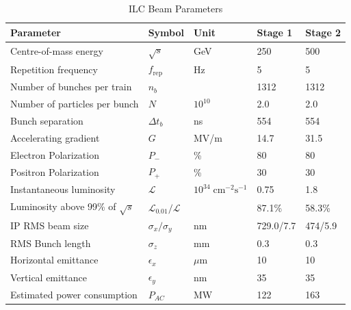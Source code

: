 \begin{table}
\caption[ILC Beam Parameters]{ILC Beam Parameters\cite{ILCTDR}}
\label{table:ilcbeamparameters}
\centering
\begin{tabular}{l l l l l }
\toprule
\textbf{Parameter}                  & \textbf{Symbol}         & \textbf{Unit}& \textbf{Stage 1} & \textbf{Stage 2} \\
\midrule
Centre-of-mass energy               & $\sqrt{s}$                &GeV                                        & 250 & 500 \\
Repetition frequency                & $f_{\text{rep}}$        &Hz                                         & 5 & 5 \\
Number of bunches per train         & $n_{b}$                 &                                           & 1312 & 1312 \\
Number of particles per bunch                    & $N$                     &$10^{10}$                      & 2.0 & 2.0 \\
Bunch separation                    & $\Delta t_b$             &ns                                         & 554 & 554 \\
\midrule
Accelerating gradient               & $G$                     &MV/m                                       & 14.7 & 31.5 \\
Electron Polarization               & $P_-$                   &\%                                       & 80 & 80 \\
Positron Polarization               & $P_+$                   &\%                                       & 30 & 30 \\
\midrule
Instantaneous luminosity                    & $\mathcal{L}$           &$10^{34}\;\text{cm}^{-2}\text{s}^{-1}$     & 0.75 & 1.8 \\
Luminosity above 99\% of $\sqrt{s}$   & $\mathcal{L}_{0.01}/\mathcal{L}$    &                            & 87.1\% & 58.3\% \\
\midrule
IP RMS beam size                    & $\sigma_x/\sigma_y$     &nm                                         & 729.0/7.7 & 474/5.9 \\
RMS Bunch length                    & $\sigma_z$              &mm                                  & 0.3 & 0.3 \\
Horizontal emittance                & $\epsilon_x$            &$\mu$m                                     & 10  & 10 \\
Vertical emittance                  & $\epsilon_y$            &nm                                         & 35 & 35 \\
Estimated power consumption         & $P_{AC}$                &MW                                & 122    & 163   \\
\bottomrule
\end{tabular}
\end{table}

